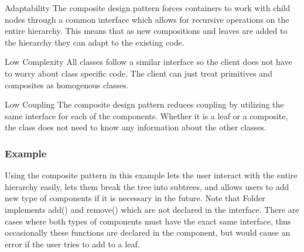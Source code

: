 
\begin{nfps}
\item[Adaptability] The composite design pattern forces containers to work with
    child nodes through a common interface which allows for recursive
    operations on the entire hierarchy. This means that as new compositions and
    leaves are added to the hierarchy they can adapt to the existing code.
\item[Low Complexity] All classes follow a similar interface so the client
    does not have to worry about class specific code. The client can just treat
    primitives and composites as homogenous classes.
\item[Low Coupling] The composite design pattern reduces coupling by utilizing
    the same interface for each of the components. Whether it is a leaf or a
    composite, the class does not need to know any information about the other
    classes. 
\end{nfps}

\subsubsection{Example}
Using the composite pattern in this example lets the user interact with the
entire hierarchy easily, lets them break the tree into subtrees, and allows
users to add new type of components if it is necessary in the future.
Note that {\sc Folder} implements {\sc add()} and {\sc remove()} which are not
declared in the interface. There are cases where both types of components must
have the exact same interface, thus occasionally these functions are declared
in the component, but would cause an error if the user tries to add to a leaf.

